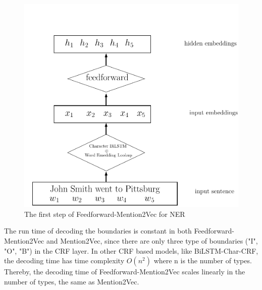 \documentclass{sfuthesis}
\begin{document}
\begin{figure}
  \centering
  \includegraphics[scale=0.6]{mention2vec4.pdf}
 \caption{The first step of Feedforward-Mention2Vec for NER}
  \label{fig:mention2vec4}
\end{figure}

The run time of decoding the boundaries is constant in both Feedforward-Mention2Vec and Mention2Vec, since there are only three type of boundaries ("I", "O", "B") in the CRF layer. In other CRF based models, like BiLSTM-Char-CRF, the decoding time has time complexity $O\left(n^2\right)$ where n is the number of types. Thereby, the decoding time of Feedforward-Mention2Vec scales linearly in the number of types, the same as Mention2Vec.
\end{document}
